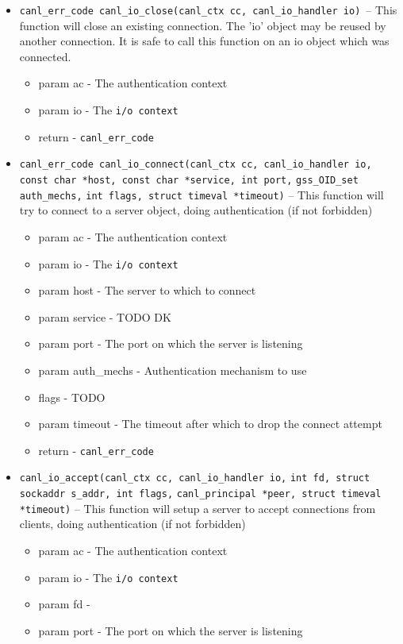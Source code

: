 \begin{itemize}
  \item \verb'canl_err_code canl_io_close(canl_ctx cc, canl_io_handler io)' --
  This function will close an existing connection.  The 'io' object may 
  be reused by another connection. It is safe to call this 
  function on an io object which was connected.
  \begin{itemize}
    \item param ac - The authentication context
    \item param io - The \verb'i/o context'
    \item return - \verb'canl_err_code'
  \end{itemize}
  \item \verb'canl_err_code canl_io_connect(canl_ctx cc, canl_io_handler io,' 
  \verb'const char *host, const char *service, int port,' 
  \verb'gss_OID_set auth_mechs,'
  \verb'int flags, struct timeval *timeout)' --
  This function will try to connect to a server object, 
  doing authentication (if not forbidden)
  \begin{itemize}
    \item param ac - The authentication context
    \item param io - The \verb'i/o context'
    \item param host - The server to which to connect
    \item param service - TODO DK
    \item param port - The port on which the server is listening
    \item param auth\_mechs - Authentication mechanism to use
    \item flags - TODO
    \item param timeout - The timeout after which to drop the connect attempt
    \item return - \verb'canl_err_code'
  \end{itemize}
  \item \verb'canl_io_accept(canl_ctx cc, canl_io_handler io,'
  \verb'int fd, struct sockaddr s_addr, int flags,'
  \verb'canl_principal *peer, struct timeval *timeout)' -- This function will 
  setup a server to accept connections from clients, doing 
  authentication (if not forbidden)
  \begin{itemize}
    \item param ac - The authentication context
    \item param io - The \verb'i/o context'
    \item param fd - \TODO
    \item param port - The port on which the server is listening
  \end{itemize}

\end{itemize}

